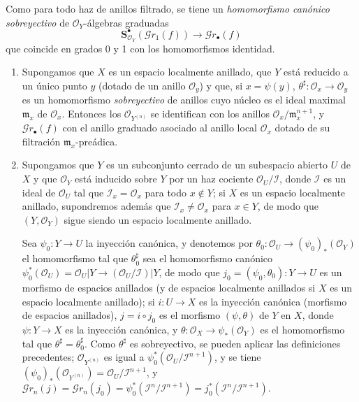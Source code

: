 Como para todo haz de anillos filtrado, se tiene un \emph{homomorfismo canónico
sobreyectivo} de $\mathcal{O}_Y$-álgebras graduadas
\[
  \mathbf{S}_{\mathcal{O}_Y}^{\bullet}(\mathscr{G}r_1(f))
  \longrightarrow\mathscr{G}r_\bullet(f)
  \tag{16.1.2.2}
  \label{IV.16.1.2.2}
\]
que coincide en grados 0 y 1 con los homomorfismos identidad.

\begin{examples}[16.1.3]
\label{IV.16.1.3}
\begin{enumerate}
\item[(i)] Supongamos que $X$ es un espacio localmente anillado, que $Y$ está
reducido a un único punto $y$ (dotado de un anillo $\mathcal{O}_y$) y que, si
$x=\psi(y)$, $\theta^\sharp:\mathcal{O}_x\to\mathcal{O}_y$ es un homomorfismo
\emph{sobreyectivo} de anillos cuyo núcleo es el ideal maximal $\mathfrak{m}_x$ de
$\mathcal{O}_x$. Entonces los $\mathcal{O}_{Y^{(n)}}$ se identifican con los anillos
$\mathcal{O}_x/\mathfrak{m}_x^{n+1}$, y $\mathscr{G}r_\bullet(f)$ con el anillo
graduado asociado al anillo local $\mathcal{O}_x$ dotado de su filtración
$\mathfrak{m}_x$-preádica.
\item[(ii)] Supongamos que $Y$ es un subconjunto cerrado de un subespacio abierto $U$
de $X$ y que $\mathcal{O}_Y$ está inducido sobre $Y$ por un haz cociente
$\mathcal{O}_U/\mathscr{I}$, donde $\mathscr{I}$ es un ideal de $\mathcal{O}_U$
tal que $\mathscr{I}_x=\mathcal{O}_x$ para todo $x\notin Y$; si $X$ es un
espacio localmente anillado, supondremos además que
$\mathscr{I}_x\neq\mathcal{O}_x$ para $x\in Y$, de modo que
$(Y,\mathcal{O}_Y)$ sigue siendo un espacio localmente anillado.

Sea $\psi_0:Y\to U$ la inyección canónica, y denotemos por
$\theta_0:\mathcal{O}_U\to(\psi_0)_*(\mathcal{O}_Y)$ el homomorfismo tal que
$\theta_0^\sharp$ sea el homomorfismo canónico
$\psi_0^*(\mathcal{O}_U)=\mathcal{O}_U|Y\to
(\mathcal{O}_U/\mathscr{I})|Y$, de modo que
$j_0=(\psi_0,\theta_0):Y\to U$ es un morfismo de espacios anillados (y de espacios
localmente anillados si $X$ es un espacio localmente anillado); si
$i:U\to X$ es la inyección canónica (morfismo de espacios anillados),
$j=i\circ j_0$ es el morfismo $(\psi,\theta)$ de $Y$ en $X$, donde
$\psi:Y\to X$ es la inyección canónica, y
$\theta:\mathcal{O}_X\to\psi_*(\mathcal{O}_Y)$ es el homomorfismo tal que
$\theta^\sharp=\theta_0^\sharp$. Como $\theta^\sharp$ es sobreyectivo, se pueden aplicar las
definiciones precedentes; $\mathcal{O}_{Y^{(n)}}$ es igual a
$\psi_0^*(\mathcal{O}_U/\mathscr{I}^{n+1})$, y se tiene
$(\psi_0)_*(\mathcal{O}_{Y^{(n)}})=\mathcal{O}_U/\mathscr{I}^{n+1}$, y
$\mathscr{G}r_n(j)=\mathscr{G}r_n(j_0)=
\psi_0^*(\mathscr{I}^n/\mathscr{I}^{n+1})=
j_0^*(\mathscr{I}^n/\mathscr{I}^{n+1})$.
\end{enumerate}
\end{examples}

